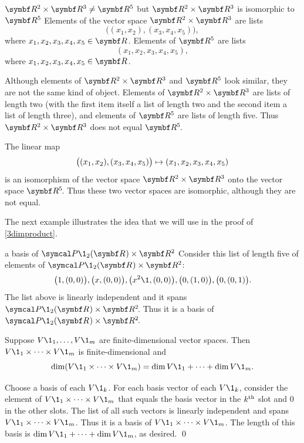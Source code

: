 \begin{example}{$\R2 \times \R3 \ne \R5$ but $\R2 \times \R3$ is isomorphic to $\R5$}
Elements of the vector space $\R2 \times \R3$ are lists
\[
\bigl( (x_1, x_2), (x_3, x_4, x_5) \bigr),
\]
where $x_1, x_2, x_3, x_4, x_5 \in \R{}$. Elements of $\R5$ are lists
\[
(x_1, x_2, x_3, x_4, x_5),
\]
where $x_1, x_2, x_3, x_4, x_5 \in \R{}$.

Although elements of $\R2 \times \R3$ and $\R5$ look similar, they are not the same kind of object. Elements of $\R2 \times \R3$ are lists of length two (with the first item itself a list of length two and the second item a list of length three), and elements of $\R5$ are lists of length five. Thus $\R2 \times \R3$ does not equal $\RR5$.

\addtolength{\marnotewidth}{-.1in}
\addtolength{\marlen}{-.1in}

The linear map
\[\overfullrule=0bp
\bigl( (x_1, x_2), (x_3, x_4, x_5) \bigr) \mapsto (x_1, x_2, x_3, x_4, x_5)
\]
is an isomorphism of the vector space $\R2 \times \R3$ onto the vector space $\RR5$. Thus these two vector spaces are isomorphic, although they are not equal.
\end{example}

The next example illustrates the idea that we will use in the proof of \ref{3dimproduct}.

\begin{example}{a basis of\/ $\P\1_2(\R{}) \times \R2$}
Consider this list of length five of elements of $\P\1_2(\R{}) \times \R2$:
\[
\bigl(1, (0,0) \bigr), \bigl(x,(0,0) \bigr), \bigl(x^2\1, (0,0) \bigr), \bigl(0, (1,0) \bigr), \bigl(0, (0, 1)\bigr).
\]
The list above is linearly independent and it spans $\P\1_2(\R{}) \times \RR2$. Thus it is a basis of $\P\1_2(\R{}) \times \RR2$.
\end{example}

{Suppose $V\1_1, \dots, V\1_m$ are finite-dimensional vector spaces. Then $V\1_1 \times \dots \times V\1_m$  is finite-dimensional and
\[
\dim (V\1_1 \times \dots \times V\1_m) = \dim V\1_1 + \dots + \dim V\1_m.
\]}

\proof
Choose a basis of each $V\1_k$. For each basis vector of each $V\1_k$, consider the element of $V\1_1 \times \dots \times V\1_m$ that equals the basis vector in the $k^{\text{{th}}}$ slot and $0$ in the other slots. The list of all such vectors is linearly independent and spans $V\1_1 \times \dots \times V\1_m$. Thus it is a basis of $V\1_1 \times \dots \times V\1_m$. The length of this basis is $\dim V\1_1 + \dots + \dim V\1_m$, as desired.
\qed

